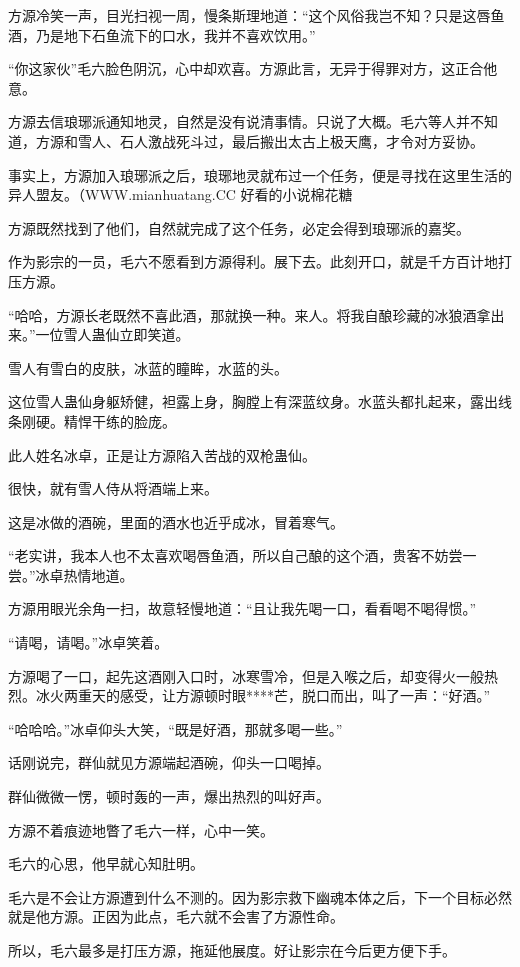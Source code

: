 \begin{this_body}
方源冷笑一声，目光扫视一周，慢条斯理地道：“这个风俗我岂不知？只是这唇鱼酒，乃是地下石鱼流下的口水，我并不喜欢饮用。”

“你这家伙”毛六脸色阴沉，心中却欢喜。方源此言，无异于得罪对方，这正合他意。

方源去信琅琊派通知地灵，自然是没有说清事情。只说了大概。毛六等人并不知道，方源和雪人、石人激战死斗过，最后搬出太古上极天鹰，才令对方妥协。

事实上，方源加入琅琊派之后，琅琊地灵就布过一个任务，便是寻找在这里生活的异人盟友。（WWW.mianhuatang.CC 好看的小说棉花糖

方源既然找到了他们，自然就完成了这个任务，必定会得到琅琊派的嘉奖。

作为影宗的一员，毛六不愿看到方源得利。展下去。此刻开口，就是千方百计地打压方源。

“哈哈，方源长老既然不喜此酒，那就换一种。来人。将我自酿珍藏的冰狼酒拿出来。”一位雪人蛊仙立即笑道。

雪人有雪白的皮肤，冰蓝的瞳眸，水蓝的头。

这位雪人蛊仙身躯矫健，袒露上身，胸膛上有深蓝纹身。水蓝头都扎起来，露出线条刚硬。精悍干练的脸庞。

此人姓名冰卓，正是让方源陷入苦战的双枪蛊仙。

很快，就有雪人侍从将酒端上来。

这是冰做的酒碗，里面的酒水也近乎成冰，冒着寒气。

“老实讲，我本人也不太喜欢喝唇鱼酒，所以自己酿的这个酒，贵客不妨尝一尝。”冰卓热情地道。

方源用眼光余角一扫，故意轻慢地道：“且让我先喝一口，看看喝不喝得惯。”

“请喝，请喝。”冰卓笑着。

方源喝了一口，起先这酒刚入口时，冰寒雪冷，但是入喉之后，却变得火一般热烈。冰火两重天的感受，让方源顿时眼****芒，脱口而出，叫了一声：“好酒。”

“哈哈哈。”冰卓仰头大笑，“既是好酒，那就多喝一些。”

话刚说完，群仙就见方源端起酒碗，仰头一口喝掉。

群仙微微一愣，顿时轰的一声，爆出热烈的叫好声。

方源不着痕迹地瞥了毛六一样，心中一笑。

毛六的心思，他早就心知肚明。

毛六是不会让方源遭到什么不测的。因为影宗救下幽魂本体之后，下一个目标必然就是他方源。正因为此点，毛六就不会害了方源性命。

所以，毛六最多是打压方源，拖延他展度。好让影宗在今后更方便下手。


\end{this_body}
